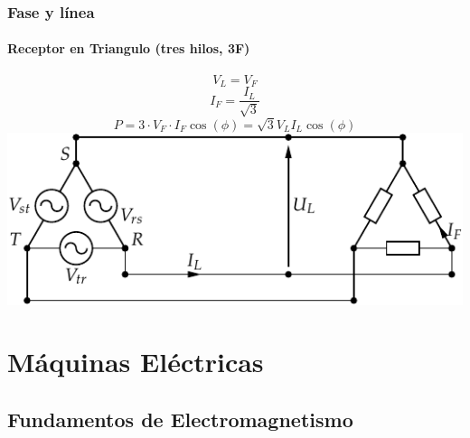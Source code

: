 \documentclass[serif, xcolor=dvipsnames]{beamer}
\begin{document}
\begin{frame}[plain]
  \frametitle{Fase y línea}


  \framesubtitle{Receptor en Triangulo (tres hilos, 3F)}
  \begin{block} {}

    \begin{center}
      \[
      V_{L}=V_{F}
      \]
      \[
      I_{F}=\frac{I_{L}}{\sqrt{3}}
      \]
      \[
      P=3\cdot V_{F}\cdot I_{F}\cos(\phi)=\sqrt{3}V_{L}I_{L}\cos(\phi)
      \]
      \includegraphics{../figs/RedTrifasicaTriangulo}
      \par\end{center}

  \end{block}

\end{frame}

\section{Máquinas Eléctricas}

\subsection{Fundamentos de Electromagnetismo}
\end{document}
